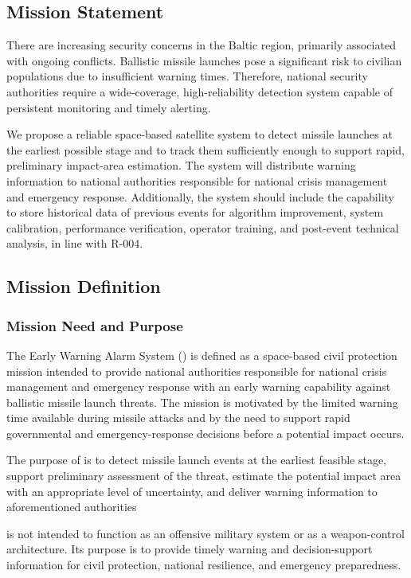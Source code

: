 \subsection{Mission Statement}

There are increasing security concerns in the Baltic region, primarily associated with ongoing conflicts. Ballistic missile launches pose a significant risk to civilian populations due to insufficient warning times. Therefore, national security authorities require a wide-coverage, high-reliability detection system capable of persistent monitoring and timely alerting.

We propose a reliable space-based satellite system to detect missile launches at the earliest possible stage and to track them sufficiently enough to support rapid, preliminary impact-area estimation. The system will distribute warning information to national authorities responsible for national crisis management and emergency response. Additionally, the system should include the capability to store historical data of previous events for algorithm improvement, system calibration, performance verification, operator training, and post-event technical analysis, in line with R-004.

\subsection{Mission Definition}

\subsubsection{Mission Need and Purpose}

The Early Warning Alarm System () is defined as a space-based civil protection mission intended to provide national authorities responsible for national crisis management and emergency response with an early warning capability against ballistic missile launch threats. The mission is motivated by the limited warning time available during missile attacks and by the need to support rapid governmental and emergency-response decisions before a potential impact occurs.

The purpose of  is to detect missile launch events at the earliest feasible stage, support preliminary assessment of the threat, estimate the potential impact area with an appropriate level of uncertainty, and deliver warning information to aforementioned authorities

 is not intended to function as an offensive military system or as a weapon-control architecture. Its purpose is to provide timely warning and decision-support information for civil protection, national resilience, and emergency preparedness.

